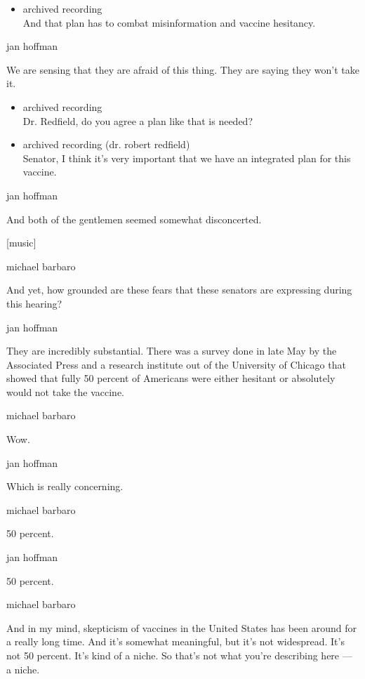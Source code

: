 \begin{itemize}
\tightlist
\item
  archived recording\\
  And that plan has to combat misinformation and vaccine hesitancy.
\end{itemize}

jan hoffman

We are sensing that they are afraid of this thing. They are saying they
won't take it.

\begin{itemize}
\item
  archived recording\\
  Dr. Redfield, do you agree a plan like that is needed?
\item
  archived recording (dr. robert redfield)\\
  Senator, I think it's very important that we have an integrated plan
  for this vaccine.
\end{itemize}

jan hoffman

And both of the gentlemen seemed somewhat disconcerted.

{[}music{]}

michael barbaro

And yet, how grounded are these fears that these senators are expressing
during this hearing?

jan hoffman

They are incredibly substantial. There was a survey done in late May by
the Associated Press and a research institute out of the University of
Chicago that showed that fully 50 percent of Americans were either
hesitant or absolutely would not take the vaccine.

michael barbaro

Wow.

jan hoffman

Which is really concerning.

michael barbaro

50 percent.

jan hoffman

50 percent.

michael barbaro

And in my mind, skepticism of vaccines in the United States has been
around for a really long time. And it's somewhat meaningful, but it's
not widespread. It's not 50 percent. It's kind of a niche. So that's not
what you're describing here --- a niche.

